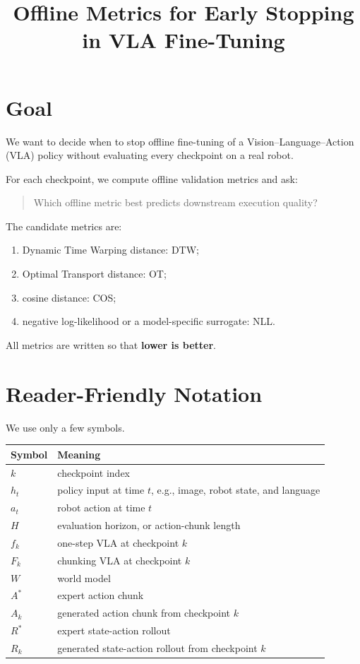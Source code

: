 \documentclass[11pt]{article}
\title{Offline Metrics for Early Stopping in VLA Fine-Tuning}
\author{}
\date{}
\begin{document}
\maketitle

\section{Goal}

We want to decide when to stop offline fine-tuning of a Vision--Language--Action (VLA) policy without evaluating every checkpoint on a real robot.

For each checkpoint, we compute offline validation metrics and ask:
\begin{quote}
Which offline metric best predicts downstream execution quality?
\end{quote}

The candidate metrics are:
\begin{enumerate}
    \item Dynamic Time Warping distance: DTW;
    \item Optimal Transport distance: OT;
    \item cosine distance: COS;
    \item negative log-likelihood or a model-specific surrogate: NLL.
\end{enumerate}

All metrics are written so that \textbf{lower is better}.

\section{Reader-Friendly Notation}

We use only a few symbols.

\begin{center}
\begin{tabular}{ll}
\toprule
Symbol & Meaning \\
\midrule
$k$ & checkpoint index \\
$h_t$ & policy input at time $t$, e.g., image, robot state, and language \\
$a_t$ & robot action at time $t$ \\
$H$ & evaluation horizon, or action-chunk length \\
$f_k$ & one-step VLA at checkpoint $k$ \\
$F_k$ & chunking VLA at checkpoint $k$ \\
$W$ & world model \\
$A^*$ & expert action chunk \\
$A_k$ & generated action chunk from checkpoint $k$ \\
$R^*$ & expert state-action rollout \\
$R_k$ & generated state-action rollout from checkpoint $k$ \\
\bottomrule
\end{tabular}
\end{center}
\end{document}
